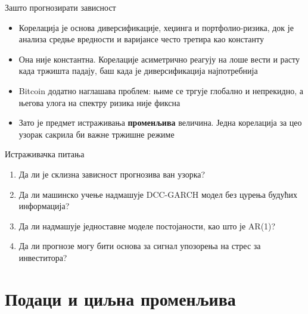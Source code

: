 \documentclass[aspectratio=169]{beamer}
\begin{document}
\begin{frame}{Зашто прогнозирати зависност}
    \begin{itemize}
        \item Корелација је основа диверсификације, хеџинга и портфолио-ризика, док је анализа средње вредности и варијансе често третира као константу
        \item Она није константна. Корелације асиметрично реагују на лоше вести и расту када тржишта падају, баш када је диверсификација најпотребнија
        \item Bitcoin додатно наглашава проблем: њиме се тргује глобално и непрекидно, а његова улога на спектру ризика није фиксна
        \item Зато је предмет истраживања \textbf{променљива} величина. Једна корелација за цео узорак сакрила би важне тржишне режиме
    \end{itemize}
\end{frame}

\begin{frame}{Истраживачка питања}
    \begin{enumerate}
        \item Да ли је склизна зависност прогнозива ван узорка?
        \item Да ли машинско учење надмашује DCC-GARCH модел без цурења будућих информација?
        \item Да ли надмашује једноставне моделе постојаности, као што је AR(1)?
        \item Да ли прогнозе могу бити основа за сигнал упозорења на стрес за инвеститора?
    \end{enumerate}
\end{frame}

\section{Подаци и циљна променљива}
\end{document}
